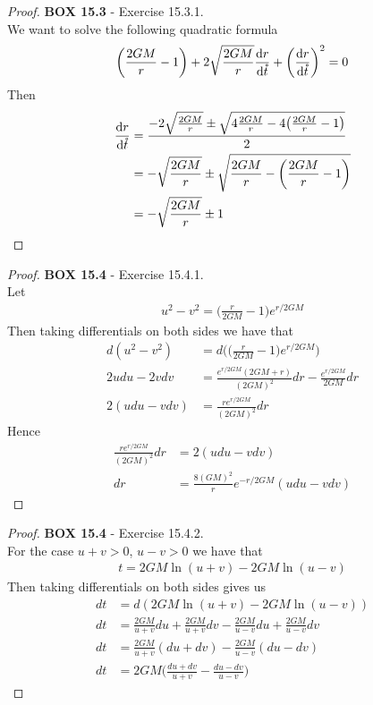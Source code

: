 \documentclass[11pt]{article}
\theoremstyle{definition}
\begin{document}
\cleardoublepage
\begin{proof}{\textbf{BOX 15.3} - Exercise 15.3.1.}\\
We want to solve the following quadratic formula
\begin{align*}
    \bigg(\frac{2GM}{r} - 1\bigg) + 2\sqrt{\frac{2GM}{r}}\dv{r}{\mathring{t}}
    + \left(\dv{r}{\mathring{t}}\right)^2 = 0
\end{align*}
Then 
\begin{align*}
    \dv{r}{\mathring{t}}
    &= \frac{-2\sqrt{\frac{2GM}{r}} 
    \pm \sqrt{4\frac{2GM}{r} - 4\big(\frac{2GM}{r} - 1\big)}}{2}\\
    &= -\sqrt{\frac{2GM}{r}}
    \pm \sqrt{\frac{2GM}{r} - \bigg(\frac{2GM}{r} - 1\bigg)}\\
    &= -\sqrt{\frac{2GM}{r}} \pm 1
\end{align*}
\end{proof}
\begin{proof}{\textbf{BOX 15.4} - Exercise 15.4.1.}\\
Let
\begin{align*}
    u^2 - v^2 = \bigg(\frac{r}{2GM} - 1\bigg)e^{r/2GM}
\end{align*}
Then taking differentials on both sides we have that
\begin{align*}
    d(u^2 - v^2) &= d\bigg(\bigg(\frac{r}{2GM} - 1\bigg)e^{r/2GM}\bigg)\\
    2udu - 2vdv
    &= \frac{e^{r/2GM}(2GM + r)}{(2GM)^2}dr - \frac{e^{r/2GM}}{2GM}dr\\
    2(udu - vdv)
    &= \frac{re^{r/2GM}}{(2GM)^2}dr
\end{align*}
Hence
\begin{align*}
    \frac{re^{r/2GM}}{(2GM)^2}dr &= 2(udu - vdv)\\
    dr &= \frac{8(GM)^2}{r}e^{-r/2GM}(udu - vdv)
\end{align*}
\end{proof}

\cleardoublepage
\begin{proof}{\textbf{BOX 15.4} - Exercise 15.4.2.}\\
For the case $u + v > 0$, $u - v > 0$ we have that
\begin{align*}
    t = 2GM\ln(u + v) - 2GM\ln(u - v)
\end{align*}
Then taking differentials on both sides gives us
\begin{align*}
    dt &= d(2GM\ln(u + v) - 2GM\ln(u - v))\\
    dt &= \frac{2GM}{u + v}du + \frac{2GM}{u + v}dv - \frac{2GM}{u - v}du
    + \frac{2GM}{u - v}dv\\
    dt &= \frac{2GM}{u + v}(du + dv) - \frac{2GM}{u - v}(du - dv)\\
    dt &= 2GM\bigg(\frac{du + dv}{u + v} - \frac{du - dv}{u - v}\bigg)
\end{align*}
\end{proof}
\end{document}
